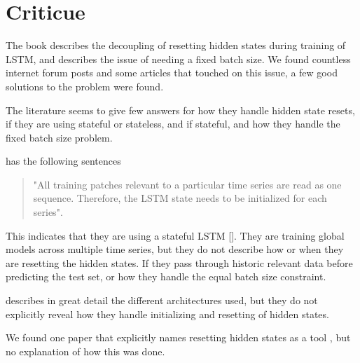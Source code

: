 
\section{Criticue}
\label{section:RelatedWork:Criticue}
The book \cite{Bharadi2021} describes the decoupling of resetting hidden
states during training of LSTM, and describes the issue of
needing a fixed batch size. We found countless internet forum posts
and some articles that touched on this issue, a few good solutions
to the problem were found.

The literature seems to give few answers for how they handle hidden state
resets, if they are using stateful or stateless, and if stateful,
and how they handle the fixed batch size problem.

\cite{Bandara2017} has the following sentences
\begin{quotation}
  "All training patches relevant to a particular time series are read as one
  sequence. Therefore, the LSTM state needs to be initialized for each
  series".

\end{quotation}
This indicates that they are using a stateful LSTM [].
They are training global models across multiple time series, but they do not
describe how or when they are resetting the hidden states.
If they pass through historic relevant data before predicting
the test set, or how they handle the equal batch size constraint.

\cite{Hewamalage2021} describes in great detail the different architectures used,
but they do not explicitly reveal how they handle initializing and resetting
of hidden states.

We found one paper that explicitly names resetting hidden states
as a tool \cite{Smyl2020}, but no explanation of how this was done.

